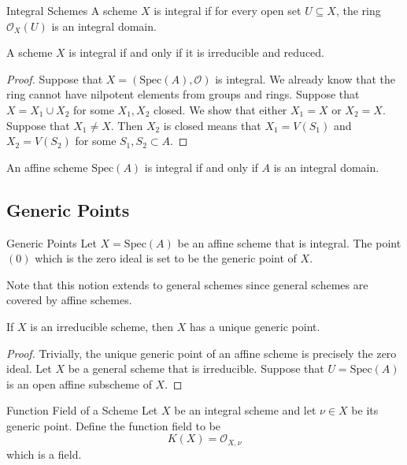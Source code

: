 \documentclass[a4paper]{article}
\begin{document}
\begin{defn}{Integral Schemes}{} A scheme $X$ is integral if for every open set $U\subseteq X$, the ring $\mathcal{O}_X(U)$ is an integral domain. 
\end{defn}

\begin{prp}{}{} A scheme $X$ is integral if and only if it is irreducible and reduced. \tcbline
\begin{proof}
Suppose that $X=(\text{Spec}(A),\mathcal{O})$ is integral. We already know that the ring cannot have nilpotent elements from groups and rings. Suppose that $X=X_1\cup X_2$ for some $X_1,X_2$ closed. We show that either $X_1=X$ or $X_2=X$. Suppose that $X_1\neq X$. Then $X_2$ is closed means that $X_1=V(S_1)$ and $X_2=V(S_2)$ for some $S_1,S_2\subset A$. 
\end{proof}
\end{prp}

\begin{prp}{}{} An affine scheme $\text{Spec}(A)$ is integral if and only if $A$ is an integral domain. 
\end{prp}

\subsection{Generic Points}
\begin{defn}{Generic Points}{} Let $X=\text{Spec}(A)$ be an affine scheme that is integral. The point $(0)$ which is the zero ideal is set to be the generic point of $X$. 
\end{defn}

Note that this notion extends to general schemes since general schemes are covered by affine schemes. 

\begin{prp}{}{} If $X$ is an irreducible scheme, then $X$ has a unique generic point. \tcbline
\begin{proof}
Trivially, the unique generic point of an affine scheme is precisely the zero ideal. Let $X$ be a general scheme that is irreducible. Suppose that $U=\text{Spec}(A)$ is an open affine subscheme of $X$. 
\end{proof}
\end{prp}

\begin{defn}{Function Field of a Scheme}{} Let $X$ be an integral scheme and let $\nu\in X$ be its generic point. Define the function field to be $$K(X)=\mathcal{O}_{X,\nu}$$ which is a field. 
\end{defn}
\end{document}
